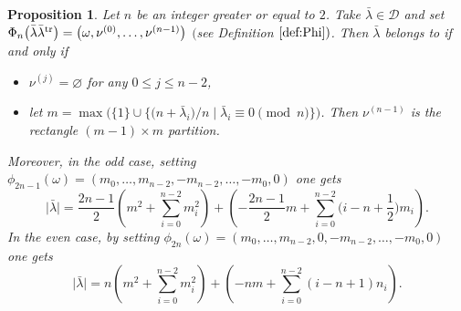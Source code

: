 \documentclass[10pt,a4paper]{amsart}
\newtheorem{Proposition}[Theorem]{Proposition}
 { \theoremstyle{definition}
\newtheorem{Definition}[Theorem]{Definition}
\newtheorem{Note}[Theorem]{Note}
\newtheorem{Example}[Theorem]{Example}
\newtheorem{Remark}[Theorem]{Remark} }
\numberwithin{equation}{section}
\newcommand{\cC}{\mathcal{C}}
\def\cch{\mathcal H}
\def\ccdd{\mathcal {DD}}
\def\ccd{\mathcal {D}}
\newcommand{\N}{\mathbb{N}}
\begin{document}
\begin{Proposition}
	\label{prop:ddprime} Let $n$ be an integer greater or equal to $2$. Take $%
	\bar{\lambda}\in \ccd$ and set $\Phi _{n}\bigl(\bar{\lambda}\bar{\lambda}^{%
		\mathrm{tr}}\bigr)=\smash{\bigl( \omega ,\nu ^{(0)},\dots ,\nu ^{(n-1)}\bigr)} $ $($see
	Definition $\ref{def:Phi})$. Then $\bar{\lambda}$ belongs to \smash{$\cC_{n}^{d,%
		\mathrm{tr},r}$} if and only if
	\begin{itemize}\itemsep=0pt
		\item $\nu^{(j)}=\varnothing$ for any $0\leq j\leq n-2$,
		
		\item let $m=\max\bigl(\lbrace 1\rbrace\cup\bigl\lbrace\bigl(n+\bar{\lambda}_i\bigr)/n \mid
		\bar{\lambda}_i\equiv 0\pmod{n}\bigr\rbrace\bigr)$. Then $\nu^{(n-1)}$ is the rectangle
		${(m-1)\times m}$ partition.
	\end{itemize}
	
	Moreover, in the odd case, setting $\phi _{2n-1}(\omega )=(m_{0},\dots
	,m_{n-2},-m_{n-2},\dots ,-m_{0},0)$ one gets%
	\begin{equation}
	\bigl\lvert \bar{\lambda}\bigr\rvert =\frac{2n-1}{2}\left(
	m^{2}+\sum_{i=0}^{n-2}m_{i}^{2}\right) +\left( -\frac{2n-1}{2}%
	m+\sum_{i=0}^{n-2}\biggl(i-n+\frac{1}{2}\biggr)m_{i}\right) . \label{eq:gkddnuimpair}
	\end{equation}%
	In the even case, by setting $\phi _{2n}(\omega )=(m_{0},\dots
	,m_{n-2},0,-m_{n-2},\dots ,-m_{0},0)$ one gets%
	\begin{equation}
	\bigl\lvert \bar{\lambda}\bigr\rvert =n\left( m^{2}+\sum_{i=0}^{n-2}m_{i}^{2}\right)
	+\left( -nm+\sum_{i=0}^{n-2}(i-n+1)n_{i}\right) .
	\label{eq:gkddnupairbvtquot}
	\end{equation}%
\end{Proposition}
\end{document}
